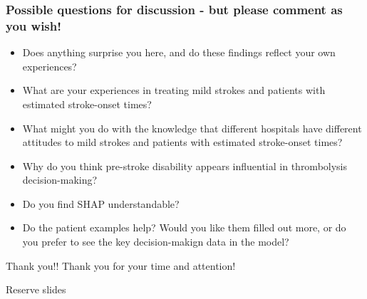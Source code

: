 \documentclass{beamer}
\begin{document}
\begin{frame}
\frametitle{Possible questions for discussion - but please comment as you wish!}
\begin{small}
\begin{itemize}
\setlength\itemsep{2mm}
    \item Does anything surprise you here, and do these findings reflect your own experiences?
    \item What are your experiences in treating mild strokes and patients with estimated stroke-onset times?
    \item What might you do with the knowledge that different hospitals have different attitudes to mild strokes and patients with estimated stroke-onset times?
    \item Why do you think pre-stroke disability appears influential in thrombolysis decision-making?
    \item Do you find SHAP understandable?
    \item Do the patient examples help? Would you like them filled out more, or do you prefer to see the key decision-makign data in the model?
\end{itemize}
\end{small}
\end{frame}

\begin{frame}{Thank you!!}
    Thank you for your time and attention!
\end{frame}




\begin{frame}{Reserve slides}
    
\end{frame}

\end{document}
